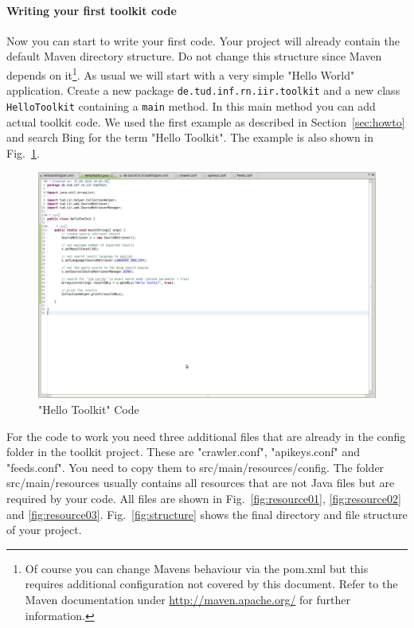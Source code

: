 \documentclass[a4paper,twoside]{article}      %
\begin{document}
\paragraph{Writing your first toolkit code} Now you can start to write your first code. Your project will already contain the default Maven directory structure. Do not change this structure since Maven depends on it\footnote{Of course you can change Mavens behaviour via the pom.xml but this requires additional configuration not covered by this document. Refer to the Maven documentation under \url{http://maven.apache.org/} for further information.}. As usual we will start with a very simple "Hello World" application. Create a new package \texttt{de.tud.inf.rn.iir.toolkit} and a new class \texttt{HelloToolkit} containing a \texttt{main} method. In this main method you can add actual toolkit code. We used the first example as described in Section~\ref{sec:howto} and search Bing for the term "Hello Toolkit". The example is also shown in Fig.~\ref{fig:hellotoolkit}.
\begin{figure}
\includegraphics[width=\textwidth]{img/ht10.png}
\caption{"Hello Toolkit" Code}
\label{fig:hellotoolkit}
\end{figure}
For the code to work you need three additional files that are already in the config folder in the toolkit project. These are "crawler.conf", "apikeys.conf" and "feeds.conf". You need to copy them to src/main/resources/config. The folder src/main/resources usually contains all resources that are not Java files but are required by your code. All files are shown in Fig.~\ref{fig:resource01}, \ref{fig:resource02} and \ref{fig:resource03}. Fig.~\ref{fig:structure} shows the final directory and file structure of your project.
\end{document}
